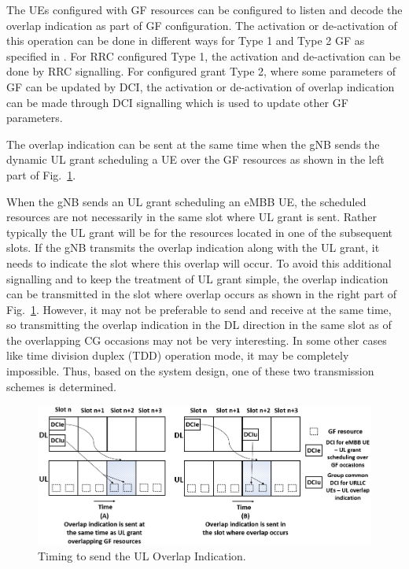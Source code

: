 \documentclass[conference]{IEEEtran}
\begin{document}
The UEs configured with GF resources can be configured to listen and decode the overlap indication as part of GF configuration. The activation or de-activation of this operation can be done in different ways for Type 1 and Type 2 GF as specified in \cite{ad4}. For RRC configured Type 1, the activation and de-activation can be done by RRC signalling. For configured grant Type 2, where some parameters of GF can be updated by DCI, the activation or de-activation of overlap indication can be made through DCI signalling which is used to update other GF parameters.

The overlap indication can be sent at the same time when the gNB sends the dynamic UL grant scheduling a UE over the GF resources as shown in the left part of Fig.~\ref{fig4}.

When the gNB sends an UL grant scheduling an eMBB UE, the scheduled resources are not necessarily in the same slot where UL grant is sent. Rather typically the UL grant will be for the resources located in one of the subsequent slots. If the gNB transmits the overlap indication along with the UL grant, it needs to indicate the slot where this overlap will occur. To avoid this additional signalling and to keep the treatment of UL grant simple, the overlap indication can be transmitted in the slot where overlap occurs as shown in the right part of Fig.~\ref{fig4}. However, it may not be preferable to send and receive at the same time, so transmitting the overlap indication in the DL direction in the same slot as of the overlapping CG occasions may not be very interesting. In some other cases like time division duplex (TDD) operation mode, it may be completely impossible. Thus, based on the system design, one of these two transmission schemes
is determined.

\begin{figure}[htbp]
\centerline{\includegraphics[scale=0.24]{fig4.PNG}}
\caption{Timing to send the UL Overlap Indication.}
\label{fig4}
\vspace{-3mm}
\end{figure}
\end{document}
